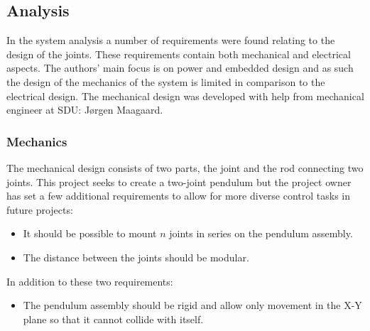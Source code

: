 \subsection{Analysis} %
\label{sub:analysis}

In the system analysis a number of requirements were found relating to the design of the joints.
These requirements contain both mechanical and electrical aspects.
The authors' main focus is on power and embedded design and as such the design of the mechanics of the system is limited in comparison to the electrical design.
The mechanical design was developed with help from mechanical engineer at SDU: Jørgen Maagaard.

\subsubsection{Mechanics} %
\label{ssub:mechanics}
The mechanical design consists of two parts, the joint and the rod connecting two joints.
This project seeks to create a two-joint pendulum but the project owner has set a few additional requirements to allow for more diverse control tasks in future projects:
\begin{itemize}
	\item It should be possible to mount $n$ joints in series on the pendulum assembly.
	\item The distance between the joints should be modular.
\end{itemize}
In addition to these two requirements:
\begin{itemize}
	\item The pendulum assembly should be rigid and allow only movement in the X-Y plane so that it cannot collide with itself.
\end{itemize}

